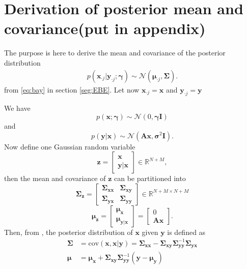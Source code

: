 \section{Derivation of posterior  mean and covariance(put in appendix)}\label{app_sec:mean_cov}
The purpose is here to derive the mean and covariance of the posterior distribution
\begin{align*}
p\left( \textbf{x}_{\cdot j} \vert \textbf{y}_{\cdot j}; \boldsymbol{\gamma}\right) \sim \mathcal{N}(\boldsymbol{\mu} _{\cdot j},\boldsymbol{\Sigma}).
\end{align*}
from \eqref{eq:bay} in section \ref{seg:EBE}. Let now $\textbf{x}_{\cdot j} = \textbf{x}$ and $\textbf{y}_{\cdot j} = \textbf{y}$

We have 
$$
p(\textbf{x};\boldsymbol{\gamma}) \sim \mathcal{N}(0,\boldsymbol{\gamma} \textbf{I} )
$$
and 
$$
p(\textbf{y}\vert \textbf{x}) \sim \mathcal{N}(\textbf{A}\textbf{x}, \boldsymbol{\sigma}^2\textbf{I}).
$$ 
Now define one Gaussian random variable  
$$
\textbf{z} = \begin{bmatrix}
\textbf{x} \\ 
\textbf{y}\vert \textbf{x} 
\end{bmatrix} \in \mathbb{R}^{N+M},	
$$   
then the mean and covariance of $\textbf{z}$ can be partitioned into 
$$
\boldsymbol{\Sigma}_{\textbf{z}} = \begin{bmatrix}
\boldsymbol{\Sigma}_{\textbf{x}\textbf{x}} & \boldsymbol{\Sigma}_{\textbf{x}\textbf{y}} \\ 
\boldsymbol{\Sigma}_{\textbf{y}\textbf{x}} & \boldsymbol{\Sigma}_{\textbf{y}\textbf{y}}
\end{bmatrix} \in \mathbb{R}^{N+M \times N+M}
$$
$$
\boldsymbol{\mu}_{\textbf{z}}  = \begin{bmatrix}
\boldsymbol{\mu}_{\textbf{x}}  \\ 
 \boldsymbol{\mu}_{\textbf{y}\vert \textbf{x}}
\end{bmatrix} = 
 \begin{bmatrix}
0  \\ 
\textbf{A}\textbf{x}
\end{bmatrix}.
$$
Then, from \cite{conditional_cov}, the posterior distribution of $\textbf{x}$ given $\textbf{y}$ is defined as
\begin{align*}
\boldsymbol{\Sigma} &= \text{cov}(\textbf{x},\textbf{x}\vert \textbf{y}) =  \boldsymbol{\Sigma}_{\textbf{xx}} - \boldsymbol{\Sigma}_{\textbf{xy}}\boldsymbol{\Sigma}_{\textbf{yy}}^{-1}\boldsymbol{\Sigma}_{\textbf{yx}} \\
\boldsymbol{\mu} &= \boldsymbol{\mu}_{\textbf{x}}+\boldsymbol{\Sigma}_{\textbf{xy}}\boldsymbol{\Sigma}_{\textbf{yy}}^{-1}(\textbf{y}-\boldsymbol{\mu}_{\textbf{y}})
\end{align*}
